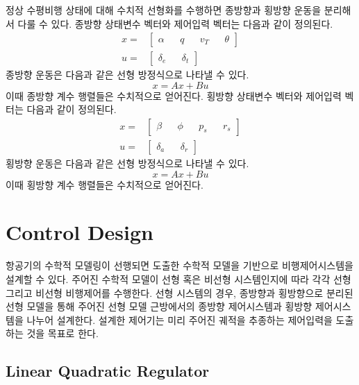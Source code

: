 \documentclass[a4paper, 12pt]{report}
\begin{document}
	정상 수평비행 상태에 대해 수치적 선형화를 수행하면 종방향과 횡방향 운동을 분리해서 다룰 수 있다.
	종방향 상태변수 벡터와 제어입력 벡터는 다음과 같이 정의된다.
	\begin{align}
		x =& \begin{bmatrix}
			\alpha && q && v_T && \theta
		\end{bmatrix} \\
		u =& \begin{bmatrix}
			\delta_e && \delta_t
		\end{bmatrix}
	\end{align}
	종방향 운동은 다음과 같은 선형 방정식으로 나타낼 수 있다.
	\begin{equation}
		x=Ax+Bu
	\end{equation}
	이때 종방향 계수 행렬들은 수치적으로 얻어진다.
	횡방향 상태변수 벡터와 제어입력 벡터는 다음과 같이 정의된다.
	\begin{align}
		x =& \begin{bmatrix}
			\beta && \phi && p_s && r_s
		\end{bmatrix} \\
		u =& \begin{bmatrix}
			\delta_a && \delta_r
		\end{bmatrix}
	\end{align}
	횡방향 운동은 다음과 같은 선형 방정식으로 나타낼 수 있다.
	\begin{equation}
		x=Ax+Bu
	\end{equation}
	이때 횡방향 계수 행렬들은 수치적으로 얻어진다.	
	\chapter{Control Design}
	
	항공기의 수학적 모델링이 선행되면 도출한 수학적 모델을 기반으로 비행제어시스템을 설계할 수 있다.
	주어진 수학적 모델이 선형 혹은 비선형 시스템인지에 따라 각각 선형 그리고 비선형 비행제어를 수행한다.
	선형 시스템의 경우, 종방향과 횡방향으로 분리된 선형 모델을 통해 주어진 선형 모델 근방에서의 종방향 제어시스템과 횡방향 제어시스템을 나누어 설계한다.
	설계한 제어기는 미리 주어진 궤적을 추종하는 제어입력을 도출하는 것을 목표로 한다.
	
	\section{Linear Quadratic Regulator}
	
\end{document}
